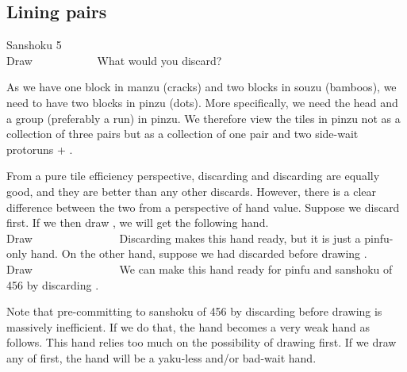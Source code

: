 \newpage
\subsection{Lining pairs}\label{sec:san5}
\begin{itembox}[r]{{\jap Sanshoku} 5}
\bp
{}~\\
\hfill\footnotesize{Draw~~~~~~~~~~~}
\ep
\vspace{-17pt}What would you discard? \vspace{-5pt}
\end{itembox}
\noindent
As we have one block in {\jap manzu} (cracks) and two blocks in {\jap souzu} (bamboos), we need to have two blocks in {\jap pinzu} (dots). More specifically, we need the head and a group (preferably a run) in {\jap pinzu}.
We therefore view the tiles in {\jap pinzu} not as a collection of three pairs but as a collection of one pair {\LARGE{}} and two side-wait protoruns {\LARGE{}} + {\LARGE{}}.

\bigskip
From a pure tile efficiency perspective, discarding {\LARGE{}} and discarding {\LARGE{}} are equally good, and they are better than any other discards. However, there is a clear difference between the two from a perspective of hand value.
Suppose we discard {\LARGE{}} first. If we then draw {\LARGE{}}, we will get the following hand.
\bp
{}~\\
\hfill\footnotesize{Draw~~~~~~~~~~~~~~~}
\ep
Discarding {\LARGE{}} makes this hand ready, but it is just a {\jap pinfu}-only hand. On the other hand, suppose we had discarded {\LARGE{}} before drawing {\LARGE{}}.
\bp
{}~\\
\hfill\footnotesize{Draw~~~~~~~~~~~~~~~}
\ep
We can make this hand ready for {\jap pinfu} and {\jap sanshoku} of 456 by discarding {\LARGE{}}.

\bigskip
Note that pre-committing to {\jap sanshoku} of 456 by discarding {\LARGE{}} before drawing {\LARGE{}} is massively inefficient. If we do that, the hand becomes a very weak hand as follows.
\bp
{}
\ep
This hand relies too much on the possibility of drawing {\LARGE{}} first. If we draw any of {\LARGE{}} first, the hand will be a {\jap yaku}-less and/or bad-wait hand.

